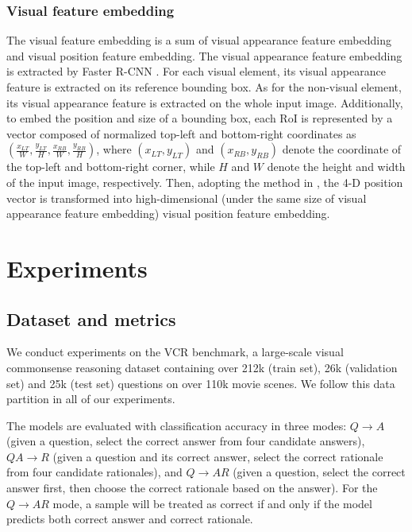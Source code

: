 \documentclass[conference]{IEEEtran}
\begin{document}
\subsubsection{Visual feature embedding}
The visual feature embedding is a sum of visual appearance feature embedding and visual position feature embedding. The visual appearance feature embedding is extracted by Faster R-CNN \cite{b39}. For each visual element, its visual appearance feature is extracted on its reference bounding box. As for the non-visual element, its visual appearance feature is extracted on the whole input image. Additionally, to embed the position and size of a bounding box, each RoI is represented by a vector composed of normalized top-left and bottom-right coordinates  as $\left(\frac{{x}_{{LT}}}{{W}}, \frac{{y}_{{LT}}}{{H}}, \frac{{x}_{{RB}}}{{W}}, \frac{{y}_{{RB}}}{{H}}\right)$, where $\left({x}_{{LT}}, {y}_{{LT}}\right)$ and $\left({x}_{{RB}}, {y}_{{RB}}\right)$ denote the coordinate of the top-left and bottom-right corner, while ${H}$ and ${W}$ denote the height and width of the input image, respectively. Then, adopting  the method in \cite{b40}, the 4-D position vector is transformed into high-dimensional (under the same size of visual appearance feature embedding) visual position feature embedding. 








\section{Experiments}


\subsection{Dataset and metrics}
We conduct experiments on the VCR \cite{b10} benchmark, a large-scale visual commonsense reasoning dataset containing over 212k (train set), 26k (validation set) and 25k (test set) questions on over 110k movie scenes. We follow this data partition in all of our experiments. 

The models are evaluated with classification accuracy in three modes: $Q \rightarrow A$ (given a question, select the correct answer from four candidate answers), $QA \rightarrow R$ (given a question and its correct answer, select the correct rationale from four candidate rationales), and $Q \rightarrow AR$ (given a question, select the correct answer first, then choose the correct rationale based on the answer). For the $Q \rightarrow AR$ mode, a sample will be treated as correct if and only if the model predicts both correct answer and correct rationale.
\end{document}
